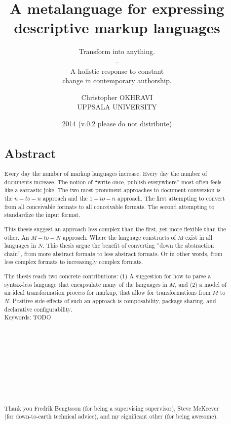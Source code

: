 \documentclass{scrreprt}
\date{2014 \smaller(v.0.2 please do not distribute)}
\title{ A metalanguage for expressing \\ descriptive markup languages }
\subtitle{Transform into anything. \\ -- \\ A holistic response to constant \\ change in contemporary authorship.}
\author{ Christopher OKHRAVI \\ UPPSALA UNIVERSITY }
\begin{document}
\maketitle






%
%
%
%
%
%


\begin{abstract}
\section*{Abstract}
Every day the number of markup languages increase. Every day the number of documents increase. The notion of ``write once, publish everywhere'' most often feels like a sarcastic joke. The two most prominent approaches to document conversion is the $n-to-n$ approach and the $1-to-n$ approach. The first attempting to convert from all conceivable formats to all conceivable formats. The second attempting to standardize the input format.

This thesis suggest an approach less complex than the first, yet more flexible than the other. An $M-to-N$ approach. Where the language constructs of $M$ exist in all languages in $N$. This thesis argue the benefit of converting ``down the abstraction chain'', from more abstract formats to less abstract formats. Or in other words, from less complex formats to increasingly complex formats.

The thesis reach two concrete contributions: (1) A suggestion for how to parse a syntax-less language that encapsulate many of the languages in $M$, and (2) a model of an ideal transformation process for markup, that allow for transformations from $M$ to $N$. Positive side-effects of such an approach is composability, package sharing, and declarative configurability. \\


Keywords: TODO  \\ \\ \\ \\ \\ \\ \\ \\ \\ \\


\smaller
\paragraph{}
\noindent Thank you Fredrik Bengtsson (for being a supervising supervisor), 
Steve McKeever (for down-to-earth technical advice),
and my significant other (for being awesome).
\end{abstract}
\end{document}
